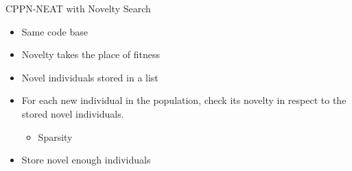 \documentclass{beamer}
\begin{document}
\begin{frame}{CPPN-NEAT with Novelty Search~\cite{lehman2011abandoning}}
\begin{itemize}
\item Same code base
\item Novelty takes the place of fitness
\item Novel individuals stored in a list
\item For each new individual in the population, check its novelty in respect to the stored novel individuals.
\begin{itemize}
\item Sparsity
\end{itemize}
\item Store novel enough individuals
\end{itemize}
\end{frame}
\end{document}
